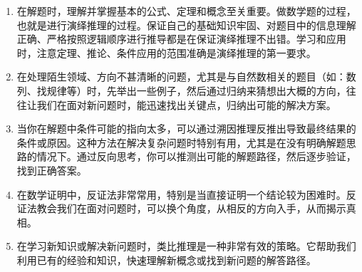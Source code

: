 \begin{enumerate}
\item 在解题时，理解并掌握基本的公式、定理和概念至关重要。做数学题的过程，也就是进行演绎推理的过程。保证自己的基础知识牢固、对题目中的信息理解正确、严格按照逻辑顺序进行推导都是在保证演绎推理不出错。学习和应用时，注意定理、推论、条件应用的范围准确是演绎推理的第一要求。
\item 在处理陌生领域、方向不甚清晰的问题，尤其是与自然数相关的题目（如：数列、找规律等）时，先举出一些例子，然后通过归纳来猜想出大概的方向，往往让我们在面对新问题时，能迅速找出关键点，归纳出可能的解决方案。
\item 当你在解题中条件可能的指向太多，可以通过溯因推理反推出导致最终结果的条件或原因。这种方法在解决复杂问题时特别有用，尤其是在没有明确解题思路的情况下。通过反向思考，你可以推测出可能的解题路径，然后逐步验证，找到正确答案。
\item 在数学证明中，反证法非常常用，特别是当直接证明一个结论较为困难时。反证法教会我们在面对问题时，可以换个角度，从相反的方向入手，从而揭示真相。
\item 在学习新知识或解决新问题时，类比推理是一种非常有效的策略。它帮助我们利用已有的经验和知识，快速理解新概念或找到新问题的解答路径。
\end{enumerate}
